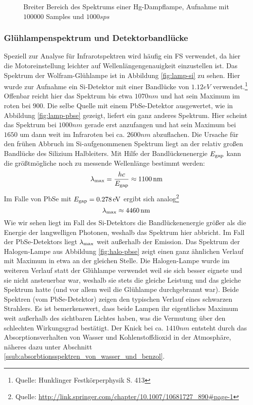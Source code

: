 			\begin{figure}[htb]
				\centering
				
				\caption{Breiter Bereich des Spektrums einer Hg-Dampflampe, 
				Aufnahme mit $100000$ Samples und $1000 \unit{sps}$}
				\label{fig:hg.spec}
			\end{figure}
			


		\subsubsection{Glühlampenspektrum und Detektorbandlücke} %
		\label{ssub:gl_hlampenspektrum}

			Speziell zur Analyse für Infrarotspektren wird häufig ein FS verwendet, da hier die Motoreinstellung leichter auf Wellenlängengenauigkeit einzustellen ist.
			Das Spektrum der Wolfram-Glühlampe ist in Abbildung \ref{fig:lamp-si} zu sehen.
			Hier wurde zur Aufnahme ein Si-Detektor mit einer Bandlücke von $1.12 \unit{eV}$ verwendet.\footnote{Quelle: Hunklinger Festkörperphysik S. 413}
			Offenbar reicht hier das Spektrum bis etwa $1070 \unit{nm}$ und hat sein Maximum im roten bei $900$.
			Die selbe Quelle mit einem PbSe-Detektor ausgewertet, wie in Abbildung \ref{fig:lamp-pbse} gezeigt, liefert ein ganz anderes Spektrum.
			Hier scheint das Spektrum bei $1000 \unit{nm}$ gerade erst anzufangen und hat sein Maximum bei $1650$ um dann weit im Infraroten bei ca. $2600 \unit{nm}$ abzuflachen.
			Die Ursache für den frühen Abbruch im Si-aufgenommenen Spektrum liegt an der relativ großen Bandlücke des Silizium Halbleiters.
			Mit Hilfe der Bandlückenenergie $E_{\mathrm{gap}}$ kann die größtmögliche noch zu messende Wellenlänge bestimmt werden:
			\[ \lambda _ {\mathrm{max}} = \frac{h c}{E_{\mathrm{gap}}} \approx 1100 \, \mathrm{nm}\]
			Im Falle von PbSe mit $E_{\mathrm{gap}} = 0.278 \, \mathrm{eV}$ ergibt sich analog\footnote{Quelle: \url{http://link.springer.com/chapter/10.1007/10681727_890#page-1}}
			\[ \lambda _ {\mathrm{max}} \approx 4460 \, \mathrm{nm}\]
			Wie wir sehen liegt im Fall des Si-Detektors die Bandlückenenergie größer als die Energie der langwelligen Photonen, weshalb das Spektrum hier abbricht.
			Im Fall der PbSe-Detektors liegt $\lambda _ {\mathrm{max}}$ weit außerhalb der Emission.
			Das Spektrum der Halogen-Lampe aus Abbildung \ref{fig:halo-pbse} zeigt einen ganz ähnlichen Verlauf mit Maximum in etwa an der gleichen Stelle.
			Die Halogen-Lampe wurde im weiteren Verlauf statt der Glühlampe verwendet weil sie sich besser eignete und sie nicht ansteuerbar war, weshalb sie stets die gleiche Leistung und das gleiche Spektrum hatte (und vor allem weil die Glühlampe durchgebrannt war).
			Beide Spektren (vom PbSe-Detektor) zeigen den typischen Verlauf eines schwarzen Strahlers.
			Es ist bemerkenswert, dass beide Lampen ihr eigentliches Maximum weit außerhalb des sichtbaren Lichtes haben, was die Vermutung über den schlechten Wirkungsgrad bestätigt.
			Der Knick bei ca. $1410 \unit{nm}$ entsteht durch das Absorptionsverhalten von Wasser und Kohlenstoffdioxid in der Atmosphäre, näheres dazu unter Abschnitt \ref{ssub:absorbtionsspektren_von_wasser_und_benzol}.


